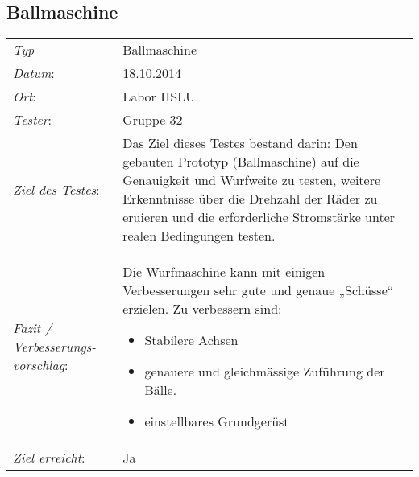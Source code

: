 \subsection{Ballmaschine}
\begin{tabular}{p{3.6cm}p{9.4cm}}
\rule{0pt}{11pt}\textit{Typ}              & Ballmaschine \\ 
\rule{0pt}{11pt}\textit{Datum}:           & 18.10.2014   \\
\rule{0pt}{11pt}\textit{Ort}:             & Labor HSLU \\
\rule{0pt}{11pt}\textit{Tester}:          & Gruppe 32 \\
\rule{0pt}{11pt}\textit{Ziel des Testes}: & Das Ziel dieses Testes bestand darin: Den gebauten Prototyp (Ballmaschine) auf die Genauigkeit und Wurfweite zu testen, weitere Erkenntnisse über die Drehzahl der Räder zu eruieren und die erforderliche Stromstärke unter realen Bedingungen testen.  \\
\rule{0pt}{11pt}\textit{Fazit / Verbesserungs-\newline vorschlag}: & Die Wurfmaschine kann mit einigen Verbesserungen sehr gute und genaue „Schüsse“ erzielen. Zu verbessern sind:
\begin{itemize}
    \item Stabilere Achsen
    \item genauere und gleichmässige Zuführung der Bälle.
    \item einstellbares Grundgerüst
\end{itemize}\\
\textit{Ziel erreicht}:& Ja\\
\end{tabular}
